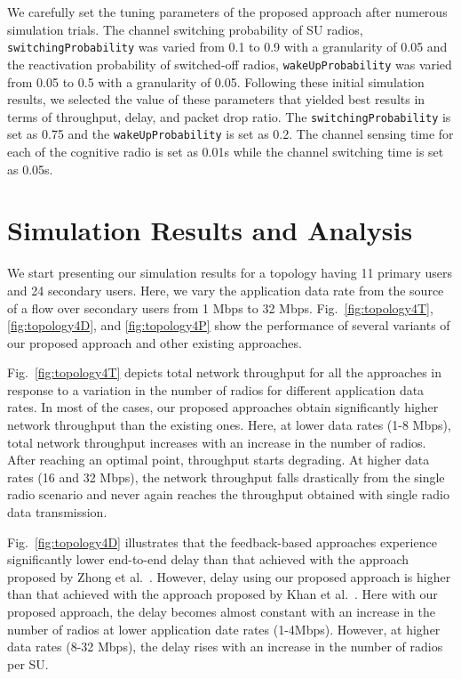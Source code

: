 We carefully set the tuning parameters of the proposed approach after numerous simulation trials. The channel switching probability of SU radios, \texttt{switchingProbability} was varied from 0.1 to 0.9 with a granularity of 0.05 and the reactivation probability of switched-off radios, \texttt{wakeUpProbability} was varied from 0.05 to 0.5 with a granularity of 0.05. Following these initial simulation results, we selected the value of these parameters that yielded best results in terms of throughput, delay, and packet drop ratio. The \texttt{switchingProbability} is set as 0.75 and the \texttt{wakeUpProbability} is set as 0.2. The channel sensing time for each of the cognitive radio is set as 0.01s while the channel switching time is set as 0.05s.

\section{Simulation Results and Analysis}

We start presenting our simulation results for a topology having 11 primary users and 24 secondary users. Here, we vary the application data rate from the source of a flow over secondary users from 1 Mbps to 32 Mbps. Fig.~\ref{fig:topology4T}, \ref{fig:topology4D}, and \ref{fig:topology4P} show the performance of several variants of our proposed approach and other existing approaches.






Fig.~\ref{fig:topology4T} depicts total network throughput for all the approaches in response to a variation in the number of radios for different application data rates. In most of the cases, our proposed approaches obtain significantly higher network throughput than the existing ones. Here, at lower data rates (1-8 Mbps), total network throughput increases with an increase in the number of radios. After reaching an optimal point, throughput starts degrading. At higher data rates (16 and 32 Mbps), the network throughput falls drastically from the single radio scenario and never again reaches the throughput obtained with single radio data transmission.

Fig.~\ref{fig:topology4D} illustrates that the feedback-based approaches experience significantly lower end-to-end delay than that achieved with the approach proposed by Zhong et al.~\cite{zhong2014capacity}. However, delay using our proposed approach is higher than that achieved with the approach proposed by Khan et al.~\cite{khan2015towards}. Here with our proposed approach, the delay becomes almost constant with an increase in the number of radios at lower application date rates (1-4Mbps). However, at higher data rates (8-32 Mbps), the delay rises with an increase in the number of radios per SU.


